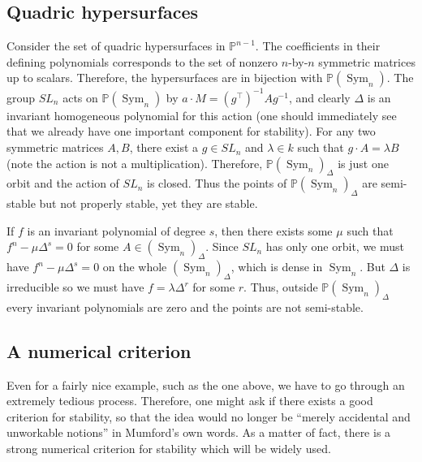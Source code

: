 \documentclass[12pt]{article}
\theoremstyle{remark}
\theoremstyle{definition}
\newcommand{\D}[0]{\Delta}
\newcommand{\Sym}[0]{\operatorname{Sym}}
\begin{document}
    \subsection{Quadric hypersurfaces}
    Consider the set of quadric hypersurfaces in $\mathbb P^{n-1}$. The coefficients in their defining polynomials corresponds to the set of nonzero $n$-by-$n$ symmetric matrices up to scalars. Therefore, the hypersurfaces are in bijection with $\mathbb P(\Sym_n)$. The group $SL_n$ acts on $\mathbb P(\Sym_n)$ by $a\cdot M=\left(g^\intercal\right)^{-1}Ag^{-1}$, and clearly $\D$ is an invariant homogeneous polynomial for this action (one should immediately see that we already have one important component for stability). For any two symmetric matrices $A, B$, there exist a $g\in SL_n$ and $\lambda\in k$ such that $g\cdot A=\lambda B$ (note the action is not a multiplication). Therefore, $\mathbb P(\Sym_n)_\D$ is just one orbit and the action of $SL_n$ is closed. Thus the points of $\mathbb P(\Sym_n)_\D$ are semi-stable but not properly stable, yet they are stable.

    If $f$ is an invariant polynomial of degree $s$, then there exists some $\mu$ such that $f^n-\mu\D^s=0$ for some $A\in(\Sym_n)_\D$. Since $SL_n$ has only one orbit, we must have $f^n-\mu\D^s=0$ on the whole $(\Sym_n)_\D$, which is dense in $\Sym_n$. But $\D$ is irreducible so we must have $f=\lambda\D^r$ for some $r$. Thus, outside $\mathbb P(\Sym_n)_\D$ every invariant polynomials are zero and the points are not semi-stable.
    \subsection{A numerical criterion}
    Even for a fairly nice example, such as the one above, we have to go through an extremely tedious process. Therefore, one might ask if there exists a good criterion for stability, so that the idea would no longer be ``merely accidental and unworkable notions'' in Mumford's own words. As a matter of fact, there is a strong numerical criterion for stability which will be widely used.
\end{document}
